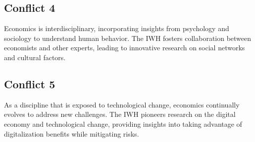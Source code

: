 \documentclass{article}
\begin{document}
\subsection{Conflict 4}
Economics is interdisciplinary, incorporating insights from psychology and sociology to understand human behavior. The IWH fosters collaboration between economists and other experts, leading to innovative research on social networks and cultural factors.

\subsection{Conflict 5}
As a discipline that is exposed to technological change, economics continually evolves to address new challenges. The IWH pioneers research on the digital economy and technological change, providing insights into taking advantage of digitalization benefits while mitigating risks.

\end{document}
